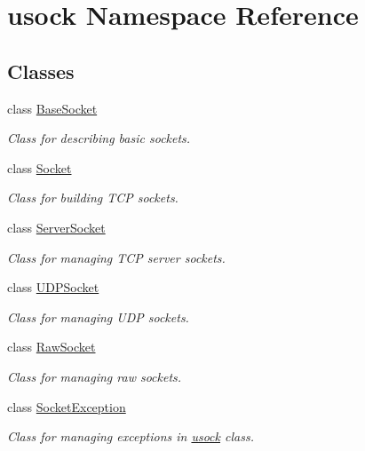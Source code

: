 \hypertarget{namespaceusock}{
\section{usock Namespace Reference}
\label{namespaceusock}
}
\subsection*{Classes}
\begin{CompactItemize}
\item 
class \hyperlink{classusock_1_1BaseSocket}{BaseSocket}
\begin{CompactList}\small\item\em Class for describing basic sockets. \item\end{CompactList}\item 
class \hyperlink{classusock_1_1Socket}{Socket}
\begin{CompactList}\small\item\em Class for building TCP sockets. \item\end{CompactList}\item 
class \hyperlink{classusock_1_1ServerSocket}{ServerSocket}
\begin{CompactList}\small\item\em Class for managing TCP server sockets. \item\end{CompactList}\item 
class \hyperlink{classusock_1_1UDPSocket}{UDPSocket}
\begin{CompactList}\small\item\em Class for managing UDP sockets. \item\end{CompactList}\item 
class \hyperlink{classusock_1_1RawSocket}{RawSocket}
\begin{CompactList}\small\item\em Class for managing raw sockets. \item\end{CompactList}\item 
class \hyperlink{classusock_1_1SocketException}{SocketException}
\begin{CompactList}\small\item\em Class for managing exceptions in \hyperlink{namespaceusock}{usock} class. \item\end{CompactList}\end{CompactItemize}
